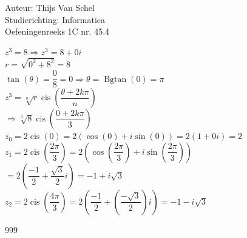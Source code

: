 \documentclass[a4paper]{article}
\begin{document}
  
\noindent \large Auteur: Thijs Van Schel \\
\noindent \large Studierichting: Informatica\\
\noindent \large Oefeningenreeks 1C nr. 45.4\\

\medskip

\normalsize

$z^3 = 8 \Rightarrow z^3 = 8+0i$\\

$r = \sqrt{0^2+8^2} = 8$\\

$\tan(\theta) = \dfrac{0}{8} = 0 \Rightarrow \theta = \operatorname{Bgtan}(0) = \pi$\\

$z^3 = \sqrt[n]{r}\operatorname{cis}\left(\dfrac{\theta + 2k\pi}{n}\right)$\\

$\Rightarrow \sqrt[3]{8}\operatorname{cis}\left(\dfrac{0+2k\pi}{3}\right)$\\

$z_0 = 2\operatorname{cis}(0) = 2(\cos(0)+i\sin(0)) = 2(1+0i) = 2$\\

$z_1 = 2\operatorname{cis}\left(\dfrac{2\pi}{3}\right) = 2\left(\cos\left(\dfrac{2\pi}{3}\right) + i\sin\left(\dfrac{2\pi}{3}\right)\right)$\\

$ = 2\left(\dfrac{-1}{2}+\dfrac{\sqrt{3}}{2}i\right) = -1+i\sqrt{3}$\\

$z_2 = 2\operatorname{cis}\left(\dfrac{4\pi}{3}\right) = 2\left(\dfrac{-1}{2}+\left(\dfrac{-\sqrt{3}}{2}\right)i\right) = -1-i\sqrt{3}$

\begin{thebibliography}{999}
\end{thebibliography}
\end{document}
